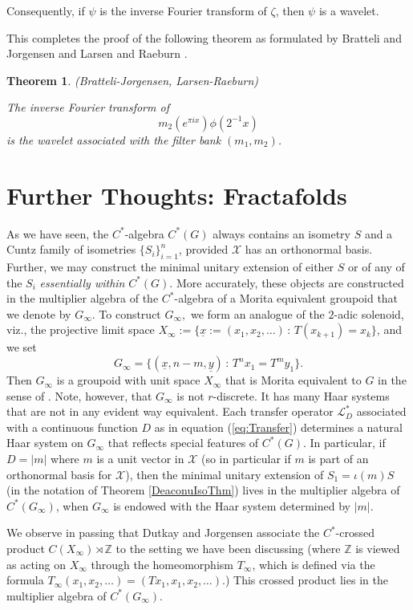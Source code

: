 \documentclass{amsproc}
\theoremstyle{plain}
\newtheorem{thm}{Theorem}[section]
\theoremstyle{definition}
\theoremstyle{definition}
\theoremstyle{remark}
\theoremstyle{plain}
\begin{document}
\noindent Consequently, if $\psi$ is the inverse Fourier transform
of $\zeta$, then $\psi$ is a wavelet.

This completes the proof of the following theorem as formulated by
Bratteli and Jorgensen \cite{BJ97} and Larsen and Raeburn \cite{LR06}. 

\begin{thm}
\label{JLR}(Bratteli-Jorgensen, Larsen-Raeburn)

The inverse Fourier transform of\[
m_{2}(e^{\pi ix})\phi(2^{-1}x)\]
 is the wavelet associated with the filter bank $(m_{1},m_{2})$. 
\end{thm}

\section{Further Thoughts: Fractafolds}

As we have seen, the $C^{*}$-algebra $C^{*}(G)$ always contains
an isometry $S$ and a Cuntz family of isometries $\{ S_{i}\}_{i=1}^{n}$,
provided $\mathcal{X}$ has an orthonormal basis. Further, we may
construct the minimal unitary extension of either $S$ or of any of
the $S_{i}$ \emph{essentially within} $C^{*}(G)$. More accurately,
these objects are constructed in the multiplier algebra of the $C^{*}$-algebra
of a Morita equivalent groupoid that we denote by $G_{\infty}$. To
construct $G_{\infty},$ we form an analogue of the $2$-adic solenoid,
viz., the projective limit space
$X_{\infty}:=\{\underline{x}:=(x_{1},x_{2},\ldots)\,:\, T(x_{k+1})=x_{k}\}$,
and we set \[
G_{\infty}=\{(\underline{x},n-m,\underline{y})\,:\, T^{n}x_{1}=T^{m}y_{1}\}.\]
Then $G_{\infty}$ is a groupoid with unit space $X_{\infty}$ that
is Morita equivalent to $G$ in the sense of \cite{MRW87}. Note,
however, that $G_{\infty}$ is not $r$-discrete. It has many Haar
systems that are not in any evident way equivalent. Each transfer
operator $\mathcal{L}_{D}^{*}$ associated with a continuous function
$D$ as in equation (\ref{eq:Transfer}) determines a natural Haar
system on $G_{\infty}$ that reflects special features of $C^{*}(G)$.
In particular, if $D=\vert m\vert$ where $m$ is a unit vector in
$\mathcal{X}$ (so in particular if $m$ is part of an orthonormal
basis for $\mathcal{X}$), then the minimal unitary extension of
$S_{1}=\iota(m)S$
(in the notation of Theorem \ref{DeaconuIsoThm}) lives in the multiplier
algebra of $C^{*}(G_{\infty})$, when $G_{\infty}$ is endowed with
the Haar system determined by $\vert m\vert$.

We observe in passing that Dutkay and Jorgensen \cite{DJ06} associate
the $C^{*}$-crossed product $C(X_{\infty})\rtimes\mathbb{Z}$ to
the setting we have been discussing (where $\mathbb{Z}$ is viewed
as acting on $X_{\infty}$ through the homeomorphism $T_{\infty}$,
which is defined via the formula
$T_{\infty}(x_{1},x_{2},\ldots)=(Tx_{1},x_{1},x_{2},\ldots)$.)
This crossed product lies in the multiplier algebra of $C^{*}(G_{\infty})$.
\end{document}
